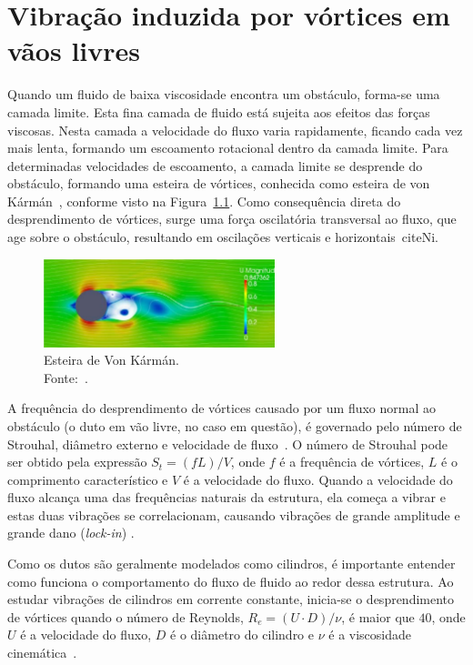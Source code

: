 \chapter{Vibração induzida por vórtices em vãos livres}

Quando um fluido de baixa viscosidade encontra um obstáculo, forma-se uma camada limite.
Esta fina camada de fluido está sujeita aos efeitos das forças viscosas.
Nesta camada a velocidade do fluxo varia rapidamente, ficando cada vez mais lenta, formando um escoamento rotacional dentro da camada limite.
Para determinadas velocidades de escoamento, a camada limite se desprende do obstáculo, formando uma esteira de vórtices, conhecida como esteira de von Kármán~\cite{Currie2002}, conforme visto na Figura~\ref{fig:viv_shading}.
Como consequência direta do desprendimento de vórtices, surge uma força oscilatória transversal ao fluxo, que age sobre o obstáculo, resultando em oscilações verticais e horizontais~cite{Ni}.

\begin{figure}[!hbt]
    \centering
    \includegraphics[width=0.6\textwidth]{imagens/viv_shading}
    \caption[Esteira de von Kármán]{Esteira de Von Kármán.\\Fonte:~\cite{VandenAbeele2013}.}
    \label{fig:viv_shading}
\end{figure}

A frequência do desprendimento de vórtices causado por um fluxo normal ao obstáculo (o duto em vão livre, no caso em questão), é governado pelo número de Strouhal, diâmetro externo e velocidade de fluxo~\cite{Mork2003}.
O número de Strouhal pode ser obtido pela expressão $S_t = (f L) / V$, onde $f$ é a frequência de vórtices, $L$ é o comprimento característico e $V$ é a velocidade do fluxo.
Quando a velocidade do fluxo alcança uma das frequências naturais da estrutura, ela começa a vibrar e estas duas vibrações se correlacionam, causando vibrações de grande amplitude e grande dano (\textit{lock-in}) \cite{Mork2003}.

Como os dutos são geralmente modelados como cilindros, é importante entender como funciona o comportamento do fluxo de fluido ao redor dessa estrutura.
Ao estudar vibrações de cilindros em corrente constante, inicia-se o desprendimento de vórtices quando o número de Reynolds, $R_e = (U\cdot D)/\nu$, é maior que $40$, onde $U$ é a velocidade do fluxo, $D$ é o diâmetro do cilindro e $\nu$ é a viscosidade cinemática~\cite{Sumer1995}.

